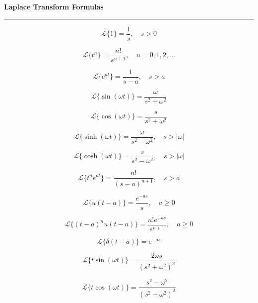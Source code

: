 \documentclass[fleqn]{article}
\begin{document}
\begin{center}
  {\LARGE \textbf{Laplace Transform Formulas}}\\[6pt]
  \rule{\linewidth}{0.5pt}
\end{center}

\begin{multicols}{2}
\small

\[
\mathcal{L}\{1\} = \frac{1}{s}, \quad s>0
\]

\[
\mathcal{L}\{t^n\} = \frac{n!}{s^{n+1}}, \quad n=0,1,2,\dots
\]

\[
\mathcal{L}\{e^{at}\} = \frac{1}{s - a}, \quad s > a
\]

\[
\mathcal{L}\{\sin(\omega t)\} = \frac{\omega}{s^2 + \omega^2}
\]

\[
\mathcal{L}\{\cos(\omega t)\} = \frac{s}{s^2 + \omega^2}
\]

\[
\mathcal{L}\{\sinh(\omega t)\} = \frac{\omega}{s^2 - \omega^2}, \quad s > |\omega|
\]

\[
\mathcal{L}\{\cosh(\omega t)\} = \frac{s}{s^2 - \omega^2}, \quad s > |\omega|
\]

\[
\mathcal{L}\{t^n e^{at}\} = \frac{n!}{(s - a)^{n+1}}, \quad s > a
\]

\[
\mathcal{L}\{u(t - a)\} = \frac{e^{-a s}}{s}, \quad a \ge 0
\]

\[
\mathcal{L}\{(t - a)^n u(t - a)\} = \frac{n! e^{-a s}}{s^{n+1}}, \quad a \ge 0
\]

\[
\mathcal{L}\{\delta(t - a)\} = e^{-a s}
\]

\[
\mathcal{L}\{t \sin(\omega t)\} = \frac{2 \omega s}{(s^2 + \omega^2)^2}
\]

\[
\mathcal{L}\{t \cos(\omega t)\} = \frac{s^2 - \omega^2}{(s^2 + \omega^2)^2}
\]

\end{multicols}
\end{document}
